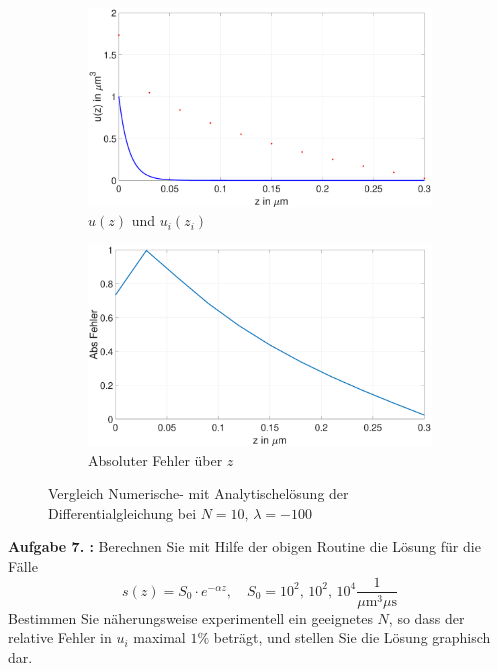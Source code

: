  \begin{figure}[]
 	\begin{subfigure}[b]{0.5\textwidth}
 		\includegraphics[width=\textwidth]{figures/station_gl_2_1/test_n10_l100}
 		\caption{$u(z)$ und $u_{i}(z_i)$}
 	\end{subfigure}
 	\hfill
 	\begin{subfigure}[b]{0.5\textwidth}
 		\includegraphics[width=1\linewidth]{figures/station_gl_2_1/test_n10_l100_fehler}
 		\caption{Absoluter Fehler über $z$}
 	\end{subfigure}
 	\caption{Vergleich Numerische- mit Analytischelösung der Differentialgleichung bei $N=10,\,\lambda=-100$}
\end{figure}

\clearpage
\begin{mybox}
	\textbf{Aufgabe 7. :}	Berechnen Sie mit Hilfe der obigen Routine die Lösung
	für die Fälle
	\begin{equation}
		s(z)=S_0\cdot e^{-\alpha z}, \quad S_0=10^2, \, 10^2, \, 10^4
		\frac{1}{\si{\mu\meter^3 \mu \s}}
	\end{equation}
	Bestimmen Sie näherungsweise experimentell ein geeignetes $N$, so dass der
	relative Fehler in $u_i$
	maximal $1\%$ beträgt, und stellen Sie die Lösung graphisch dar.
\end{mybox}

